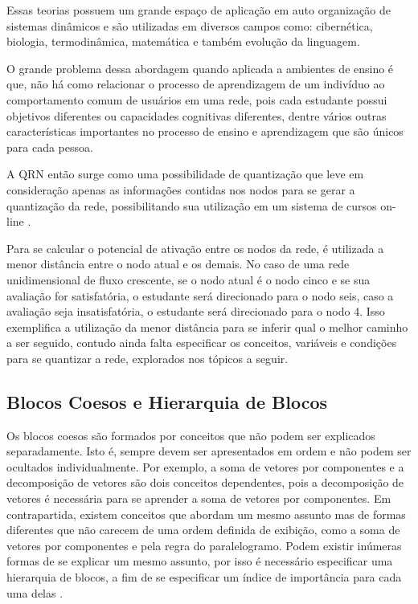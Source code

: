 Essas teorias possuem um grande espaço de aplicação em auto organização de sistemas dinâmicos e são utilizadas em diversos campos como: cibernética, biologia, termodinâmica, matemática e também evolução da linguagem.

O grande problema dessa abordagem quando aplicada a ambientes de ensino é que, não há como relacionar o processo de aprendizagem de um indivíduo ao comportamento comum de usuários em uma rede, pois cada estudante possui objetivos diferentes ou capacidades cognitivas diferentes, dentre vários outras características importantes no processo de ensino e aprendizagem que são únicos para cada pessoa.

A QRN então surge como uma possibilidade de quantização que leve em consideração apenas as informações contidas nos nodos para se gerar a quantização da rede, possibilitando sua utilização em um sistema de cursos on-line \cite{fragelli2010}.

Para se calcular o potencial de ativação entre os nodos da rede, é utilizada a menor distância entre o nodo atual e os demais. No caso de uma rede unidimensional de fluxo crescente, se o nodo atual é o nodo cinco e se sua avaliação for satisfatória, o estudante será direcionado para o nodo seis, caso a avaliação seja insatisfatória, o estudante será direcionado para o nodo 4. Isso exemplifica a utilização da menor distância para se inferir qual o melhor caminho a ser seguido, contudo ainda falta especificar os conceitos, variáveis e condições para se  quantizar a rede, explorados nos tópicos a seguir.

\subsection{Blocos Coesos e Hierarquia de Blocos}

Os blocos coesos são formados por conceitos que não podem ser explicados separadamente. Isto é, sempre devem ser apresentados em ordem e não podem ser ocultados individualmente. Por exemplo, a soma de vetores por componentes e a decomposição de vetores são dois conceitos dependentes, pois a decomposição de vetores é necessária para se aprender a soma de vetores por componentes.
Em contrapartida, existem conceitos que abordam um mesmo assunto mas de formas diferentes que não carecem de uma ordem definida de exibição, como a soma de vetores por componentes e pela regra do paralelogramo. Podem existir inúmeras formas de se explicar um mesmo assunto, por isso é necessário especificar uma hierarquia de blocos, a fim de se especificar um índice de importância para cada uma delas \cite{fragelli2010}.

